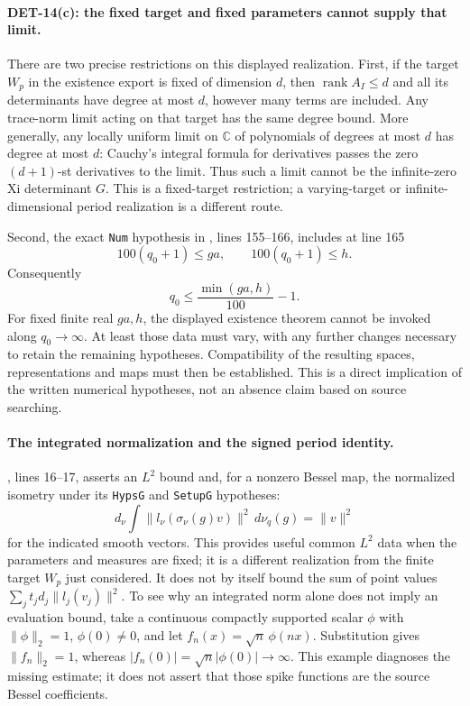 \paragraph{DET-14(c): the fixed target and fixed parameters cannot supply that limit.}
There are two precise restrictions on this displayed realization.
First, if the target \(W_p\) in the existence export is fixed of
dimension \(d\), then \(\operatorname{rank}A_I\le d\) and all its
determinants have degree at most \(d\), however many terms are
included. Any trace-norm limit acting on that target has the
same degree bound. More generally, any locally uniform limit on
\(\mathbb C\) of polynomials of degrees at most \(d\) has degree
at most \(d\): Cauchy's integral formula for derivatives passes
the zero \((d+1)\)-st derivatives to the limit. Thus such a limit
cannot be the infinite-zero Xi determinant \(G\).
This is a fixed-target restriction; a varying-target or
infinite-dimensional period realization is a different route.

Second, the exact \texttt{Num} hypothesis in
,
lines 155--166, includes at line 165
\[
 100(q_0+1)\le ga,\qquad 100(q_0+1)\le h.
\]
Consequently
\[
 q_0\le\frac{\min(ga,h)}{100}-1.
\]
For fixed finite real \(ga,h\), the displayed existence theorem
cannot be invoked along \(q_0\to\infty\).
At least those data must vary, with any further changes necessary
to retain the remaining hypotheses. Compatibility of the resulting
spaces, representations and maps must then be established.
This is a direct implication of the written numerical hypotheses,
not an absence claim based on source searching.

\paragraph{The integrated normalization and the signed period identity.}
,
lines 16--17, asserts an \(L^2\) bound and, for a nonzero Bessel map,
the normalized isometry under its \texttt{HypsG} and
\texttt{SetupG} hypotheses:
\[
 d_\nu\int
 \|l_\nu(\sigma_\nu(g)v)\|^2\,d\nu_q(g)=\|v\|^2
\]
for the indicated smooth vectors. This provides useful common
\(L^2\) data when the parameters and measures are fixed; it is
a different realization from the finite target \(W_p\) just considered.
It does not by itself bound the sum of point values
\(\sum_jt_jd_j\|l_j(v_j)\|^2\).
To see why an integrated norm alone does not imply an evaluation
bound, take a continuous compactly supported scalar \(\phi\) with
\(\|\phi\|_2=1\), \(\phi(0)\ne0\), and let
\(f_n(x)=\sqrt n\,\phi(nx)\).
Substitution gives \(\|f_n\|_2=1\), whereas
\(|f_n(0)|=\sqrt n|\phi(0)|\to\infty\).
This example diagnoses the missing estimate; it does not assert
that those spike functions are the source Bessel coefficients.

